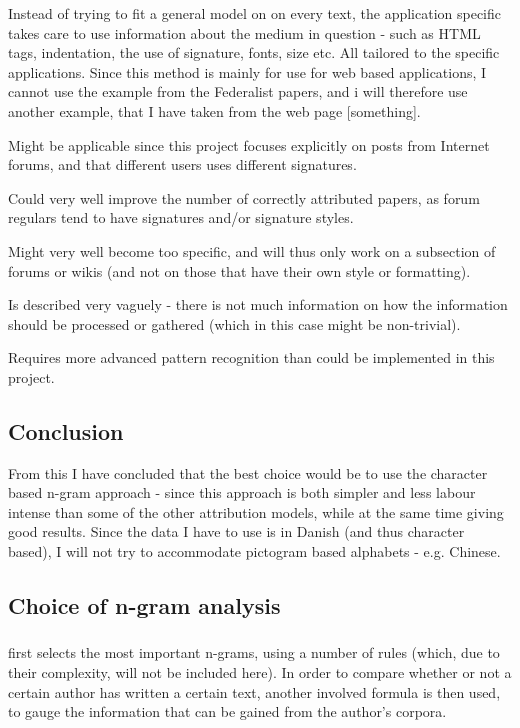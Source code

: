 {\label{application}
Instead of trying to fit a general model on on every text, the application specific takes care to use information about the medium in question - such as HTML tags, indentation, the use of signature, fonts, size etc. All tailored to the specific applications.
}
{
Since this method is mainly for use for web based applications, I cannot use the example from the Federalist papers, and i will therefore use another example, that I have taken from the web page [something]. 
\q{}
}
{
\item Might be applicable since this project focuses explicitly on posts from Internet forums, and that different users uses different signatures.
\item Could very well improve the number of correctly attributed papers, as forum regulars tend to have signatures and/or signature styles.
}{
\item Might very well become too specific, and will thus only work on a subsection of forums or wikis (and not on those that have their own style or formatting).
\item Is described very vaguely - there is not much information on how the information should be processed or gathered (which in this case might be non-trivial).
\item Requires more advanced pattern recognition than could be implemented in this project. 
}

\subsection{Conclusion}
\label{technique:conclusion}
From this I have concluded that the best choice would be to use the character based n-gram approach - since this approach is both simpler and less labour intense than some of the other attribution models, while at the same time giving good results. Since the data I have to use is in Danish (and thus character based), I will not try to accommodate pictogram based alphabets - e.g. Chinese.


\subsection{Choice of n-gram analysis}

\subsubsection{\cite{nr3}}
\cite{nr3} first selects the most important n-grams, using a number of rules (which, due to their complexity, will not be included here). In order to compare whether or not a certain author has written a certain text, another involved formula is then used, to gauge the information that can be gained from the author's corpora.

